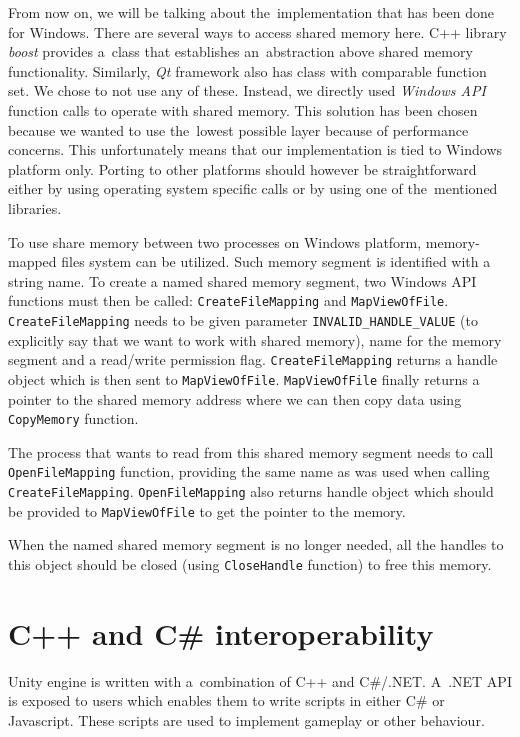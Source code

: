 \documentclass[
  digital, %
  table,   %
  nolof,     %
  nolot,     %
  oneside,
]{fithesis3}
\begin{document}
From now on, we will be talking about the implementation that has been done for Windows. There are several ways to access shared memory here. C++ library \textit{boost} provides a class that establishes an abstraction above shared memory functionality. Similarly, \textit{Qt} framework also has class with comparable function set. We chose to not use any of these. Instead, we directly used \textit{Windows API} function calls to operate with shared memory. This solution has been chosen because we wanted to use the lowest possible layer because of performance concerns. This unfortunately means that our implementation is tied to Windows platform only. Porting to other platforms should however be straightforward either by using operating system specific calls or by using one of the mentioned libraries.

To use share memory between two processes on Windows platform, memory-mapped files system can be utilized. Such memory segment is identified with a string name. To create a named shared memory segment, two Windows API functions must then be called: \texttt{Create\-File\-Map\-ping} and \texttt{Map\-View\-Of\-File}. \texttt{CreateFile\-Map\-ping} needs to be given parameter \texttt{INVALID\_HANDLE\_VALUE} (to explicitly say that we want to work with shared memory), name for the memory segment and a read/write permission flag. \texttt{Create\-File\-Map\-ping} returns a handle object which is then sent to \texttt{Map\-View\-Of\-File}. \texttt{Map\-View\-Of\-File} finally returns a pointer to the shared memory address where we can then copy data using \texttt{Copy\-Me\-mo\-ry} function.

The process that wants to read from this shared memory segment needs to call \texttt{Open\-File\-Map\-ping} function, providing the same name as was used when calling \texttt{Create\-File\-Map\-ping}. \texttt{Open\-File\-Map\-ping} also returns handle object which should be provided to \texttt{Map\-View\-Of\-File} to get the pointer to the memory.

When the named shared memory segment is no longer needed, all the handles to this object should be closed (using \texttt{Close\-Hand\-le} function) to free this memory.

\section{C++ and C\# interoperability}
Unity engine is written with a combination of C++ and C\#/.NET. A .NET API is exposed to users which enables them to write scripts in either C\# or Javascript. These scripts are used to implement gameplay or other behaviour.
\end{document}

